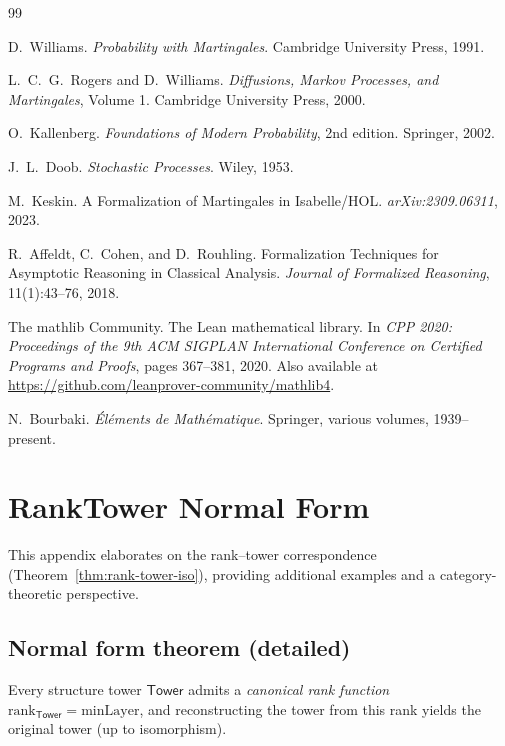 \documentclass[11pt]{article}
\theoremstyle{definition}
\theoremstyle{remark}
\newcommand{\minLayer}{\mathrm{minLayer}}
\newcommand{\rank}{\mathrm{rank}}
\newcommand{\Tower}{\mathsf{Tower}}
\begin{document}
\begin{thebibliography}{99}

D.~Williams.
\textit{Probability with Martingales}.
Cambridge University Press, 1991.

L.~C.~G.~Rogers and D.~Williams.
\textit{Diffusions, Markov Processes, and Martingales}, Volume 1.
Cambridge University Press, 2000.

O.~Kallenberg.
\textit{Foundations of Modern Probability}, 2nd edition.
Springer, 2002.

J.~L.~Doob.
\textit{Stochastic Processes}.
Wiley, 1953.

M.~Keskin.
A Formalization of Martingales in Isabelle/HOL.
\textit{arXiv:2309.06311}, 2023.

R.~Affeldt, C.~Cohen, and D.~Rouhling.
Formalization Techniques for Asymptotic Reasoning in Classical Analysis.
\textit{Journal of Formalized Reasoning}, 11(1):43--76, 2018.

The mathlib Community.
The Lean mathematical library.
In \textit{CPP 2020: Proceedings of the 9th ACM SIGPLAN International Conference on Certified Programs and Proofs}, pages 367--381, 2020.
Also available at \url{https://github.com/leanprover-community/mathlib4}.

N.~Bourbaki.
\textit{Éléments de Mathématique}.
Springer, various volumes, 1939--present.

\end{thebibliography}

\newpage
\appendix

\section{RankTower Normal Form}
\label{app:normal-form}

This appendix elaborates on the rank--tower correspondence (Theorem~\ref{thm:rank-tower-iso}), providing additional examples and a category-theoretic perspective.

\subsection{Normal form theorem (detailed)}

Every structure tower $\Tower$ admits a \emph{canonical rank function} $\rank_\Tower = \minLayer$, and reconstructing the tower from this rank yields the original tower (up to isomorphism).
\end{document}

